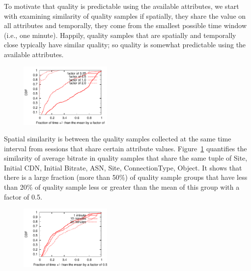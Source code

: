 {To motivate that quality is predictable using the available attributes, we start with examining similarity of quality samples if spatially, they share the value on all attributes and temporally, they come from the smallest possible time window (i.e., one minute).
Happily, quality samples that are spatially and temporally close typically have similar quality; so quality is somewhat predictable using the available attributes.

\begin{figure}[h!]
\centering
 \includegraphics[width=0.4\textwidth] {figures/spatial-similarity.pdf}
\label{fig:spatial-similarity}
\end{figure}

 Spatial similarity is between the quality samples collected at the same time interval from sessions that share certain attribute values.  Figure~\ref{fig:spatial-similarity} quantifies the similarity of average bitrate in quality samples that share the same tuple of Site, Initial CDN, Initial Bitrate, ASN, Site, ConnectionType, Object. It shows that there is a large fraction (more than 50\%) of quality sample groups that have less than 20\% of quality sample less or greater than the mean of this group with a factor of 0.5.

\begin{figure}[h!]
\centering
 \includegraphics[width=0.4\textwidth] {figures/temporal-similarity.pdf}
\label{fig:temporal-similarity}
\end{figure}

}
